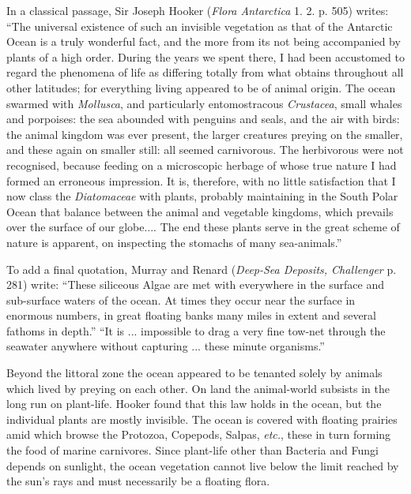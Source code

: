 \documentclass[a4paper, 12pt, oneside, landscape]{article}
\begin{document}
In a classical passage, Sir Joseph Hooker (\emph{Flora Antarctica} 1. 2. p. 505) writes: ``The universal existence of such an invisible vegetation as that of the Antarctic Ocean is a truly wonderful fact, and the more from its not being accompanied by plants of a high order. During the years we spent there, I had been accustomed to regard the phenomena of life as differing totally from what obtains throughout all other latitudes; for everything living appeared to be of animal origin. The ocean swarmed with \emph{Mollusca}, and particularly entomostracous \emph{Crustacea}, small whales and porpoises: the sea abounded with penguins and seals, and the air with birds: the animal kingdom was ever present, the larger creatures preying on the smaller, and these again on smaller still: all seemed carnivorous. The herbivorous were not recognised, because feeding on a microscopic herbage of whose true nature I had formed an erroneous impression. It is, therefore, with no little satisfaction that I now class the \emph{Diatomaceae} with plants, probably maintaining in the South Polar Ocean that balance between the animal and vegetable kingdoms, which prevails over the surface of our globe.... The end these plants serve in the great scheme of nature is apparent, on inspecting the stomachs of many sea-animals.''

To add a final quotation, Murray and Renard (\emph{Deep-Sea Deposits, Challenger} p. 281) write: ``These siliceous Algae are met with everywhere in the surface and sub-surface waters of the ocean. At times they occur near the surface in enormous numbers, in great floating banks many miles in extent and several fathoms in depth.'' ``It is ... impossible to drag a very fine tow-net through the seawater anywhere without capturing ... these minute organisms.'' 

Beyond the littoral zone the ocean appeared to be tenanted solely by animals which lived by preying on each other. On land the animal-world subsists in the long run on plant-life. Hooker found that this law holds in the ocean, but the individual plants are mostly invisible. The ocean is covered with floating prairies amid which browse the Protozoa, Copepods, Salpas, \emph{etc.}, these in turn forming the food of marine carnivores. Since plant-life other than Bacteria and Fungi depends on sunlight, the ocean vegetation cannot live below the limit reached by the sun's rays and must necessarily be a floating flora. 
\end{document}
